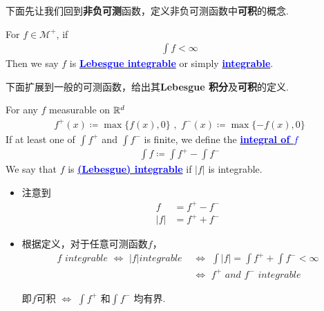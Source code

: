  	\vspace{2em}
 	下面先让我们回到\textbf{非负可测}函数，定义非负可测函数中\textbf{可积}的概念.
 	\begin{defn}\label{def 3.1.5}
 		For $f \in \mathcal{M}^{+}$, if
 		\begin{align}
 			\int{f} < \infty
 		\end{align}
 		Then we say $f$ is \underline{\textcolor{blue}{\textbf{Lebesgue integrable}}} or simply \underline{\textcolor{blue}{\textbf{integrable}}}.
 	\end{defn}
 
 	\vspace{2em}
 	下面扩展到一般的可测函数，给出其\textbf{Lebesgue 积分}及\textbf{可积}的定义.
 	\begin{defn}\label{def 3.1.6}
 		For any $f$ measurable on $\mathbb{R}^d$
 		\begin{align}
 			f^{+}(x) \coloneqq \max{\{ f(x) , 0 \}} \,\, , \,\, f^{-}(x) \coloneqq \max{\{ -f(x) , 0 \}}
 		\end{align}
 		If at least one of $\int{f^{+}}$ and $\int{f^{-}}$ is finite, we define the \underline{\textcolor{blue}{\textbf{integral of $f$}}}
 		\begin{align}
 			\int{f} \coloneqq \int{f^{+}} - \int{f^{-}}
 		\end{align}
 		We say that $f$ is \underline{\textcolor{blue}{\textbf{(Lebesgue) integrable}}} if $\left| f \right|$ is integrable.
 		
 		\vspace{1em}
 		\begin{rmk}
 			\begin{itemize}
 				\item 注意到
 				\begin{align}
 					f &= f^{+} - f^{-} \\
 					\left| f \right| &= f^{+} + f^{-}
 				\end{align}
 			
 				\item 根据定义，对于任意可测函数$f$，
 				\begin{align}
 					f \,\, integrable \,\, \Leftrightarrow \,\, \left| f \right| integrable \,\, &\Leftrightarrow \,\, \int{\left| f \right|} = \int{f^{+}} + \int{f^{-}} < \infty \\
 					&\Leftrightarrow \,\, f^{+} \,\, and \,\, f^{-} \,\, integrable
 				\end{align}
 				\begin{center}
 					即$f$可积 $\Leftrightarrow$ $\int{f^{+}}$ 和$\int{f^{-}}$ 均有界.
 				\end{center}
 			\end{itemize}
 		\end{rmk}
 	\end{defn}
 
